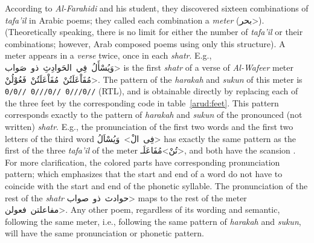 \documentclass[journal,10pt,twocolumns,letter]{IEEEtran}
\begin{document}
According to \textit{Al-Farahidi} and his student, they discovered sixteen combinations of
\textit{tafa'il} in Arabic poems; they called each combination a \textit{meter}
(\<بحر>). (Theoretically speaking, there is no limit for either the number of
\textit{tafa'il} or their combinations; however, Arab composed poems using only this structure). A
meter appears in a \textit{verse} twice, once in each \textit{shatr}. E.g., 
\mbox{\<وَيُسْأَلُ فِي الحَوادِثِ ذو صَواب>} is the first \textit{shatr} of a verse of \textit{Al-Wafeer} meter
\mbox{\<مُفَاْعَلَتُنْ مُفَاْعَلَتُنْ فَعُوْلُنْ>}. The pattern of the \textit{harakah} and \textit{sukun} of
this meter is \mbox{\texttt{0/0// 0///0// 0///0//}} (RTL), and is obtainable directly by replacing
each of the three feet by the corresponding code in table~\ref{arud:feet}. This pattern corresponds
exactly to the pattern of \textit{harakah} and \textit{sukun} of the pronounced (not written)
\textit{shatr}. E.g., the pronunciation of the first two words and the first two letters of the
third word \mbox{\textcolor{fgred}{\<فِى الْ>} \textcolor{OliveGreen}{\<وَيُسْاَلُ>}} has exactly the same
pattern as the first of the three \textit{{tafa'il}} of the meter
\mbox{\textcolor{fgred}{\<تُنْ>}\textcolor{OliveGreen}{\<مُفَاعَلَـ>}}, and both have the scansion
\texttt{\color{fgred}{0/}\color{OliveGreen}{//0//}}. For more clarification, the colored parts have
corresponding pronunciation pattern; which emphasizes that the start and end of a word do not have
to coincide with the start and end of the phonetic syllable. The pronunciation of the rest of the
\textit{shatr} \mbox{\<حوادث ذو صواب>} maps to the rest of the meter
\mbox{\<مفاعلتن فعولن>}. Any other poem, regardless of its wording and semantic, following
the same meter, i.e., following the same pattern of \textit{harakah} and \textit{sukun}, will have
the same pronunciation or phonetic pattern.
\end{document}
